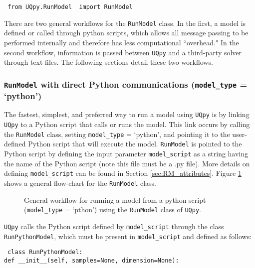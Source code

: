 \documentclass[./UsersGuide.tex]{subfiles}
\begin{document}
\vspace{4mm}
\texttt{{\color{blue} from} \texttt{UQpy.RunModel} {\color{blue} import} RunModel}
\vspace{4mm}

\noindent There are two general workflows for the \texttt{RunModel} class. In the first, a model is defined or called through python scripts, which allows all message passing to be performed internally  and therefore has less computational ``overhead." In the second workflow, information is passed between \texttt{UQpy} and a third-party solver through text files. The following sections detail these two workflows.

\subsubsection{\texttt{RunModel} with direct Python communications (\texttt{model\_type} = `python')}

The fastest, simplest, and preferred way to run a model using \texttt{UQpy} is by linking \texttt{UQpy} to a Python script that calls or runs the model. This link occurs by calling the \texttt{RunModel} class, setting \texttt{model\_type} = `python', and pointing it to the user-defined Python script that will execute the model. \texttt{RunModel} is pointed to the Python script by defining the input parameter \texttt{model\_script} as a string having the name of the Python script (note this file must be a .py file). More details on defining \texttt{model\_script} can be found in Section \ref{sec:RM_attributes}. Figure \ref{fig:RunModel_Python} shows a general flow-chart for the \texttt{RunModel} class.
\begin{figure}[!ht]
	\caption{General workflow for running a model from a python script (\texttt{model\_type} = `pthon') using the \texttt{RunModel} class of \texttt{UQpy}.}
	\label{fig:RunModel_Python}
\end{figure}

\texttt{UQpy} calls the Python script defined by \texttt{model\_script} through the class \texttt{RunPythonModel}, which must be present in \texttt{model\_script} and defined as follows:

\vspace{4mm}
\texttt{{\color{blue} class} \texttt{RunPythonModel:}}\\

\hspace{1cm} \texttt{def \_\_init\_\_(self, samples=None, dimension=None):}\\
\end{document}
